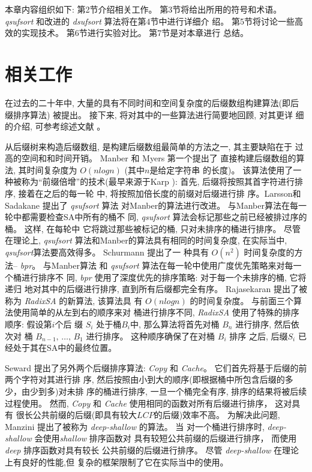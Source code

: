 本章内容组织如下: 第2节介绍相关工作。 第3节将给出所用的符号和术语。
\emph{qsufsort} 和改进的 \emph{dsufsort} 算法将在第4节中进行详细介
绍。 第5节将讨论一些高效的实现技术。 第6节进行实验对比。 第7节是对本章进行
总结。

\section{相关工作}

在过去的二十年中, 大量的具有不同时间和空间复杂度的后缀数组构建算法(即后
缀排序算法) 被提出。 接下来, 将对其中的一些算法进行简要地回顾, 对其更详
细的介绍, 可参考综述文献 \cite{Puglisi2007} \cite{Dhaliwal2012}。

从后缀树来构造后缀数组, 是构建后缀数组最简单的方法之一, 其主要缺陷在于
过高的空间和和时间开销。 Manber 和 Myers \cite{Manber1993} 第一个提出了
直接构建后缀数组的算法, 其时间复杂度为 $O(nlogn)$ (其中$n$是给定字符串
的长度)。 该算法使用了一种被称为“前缀倍增”的技术(最早来源于Karp
\cite{Karp1972}): 首先, 后缀将按照其首字符进行排序, 接着在之后的每一轮
中, 将按照加倍长度的前缀对后缀进行排
序。Larsson和Sadakane\cite{Larsson2007} 提出了 \emph{qsufsort} 算法
对Manber的算法进行改进。 与Manber算法在每一轮中都需要检查SA中所有的桶不
同, \emph{qsufsort} 算法会标记那些之前已经被排过序的桶。 这样, 在每轮中
它将跳过那些被标记的桶, 只对未排序的桶进行排序。 尽管在理论上,
\emph{qsufsort} 算法和Manber的算法具有相同的时间复杂度, 在实际当中,
\emph{qsufsort}算法要高效得多。 Schurmann\cite{Schurmann2007} 提出了一
种具有 $O(n^2)$ 时间复杂度的方法-- \emph{bpr}。 与Manber算法
和 \emph{qsufsort} 算法在每一轮中使用广度优先策略来对每一个桶进行排序不
同, \emph{bpr} 使用了深度优先的排序策略: 对于每一个未排序的桶, 它将递归
地对其中的后缀进行排序, 直到所有后缀都完全有序。  Rajasekaran
\cite{Rajasekaran2014} 提出了被称为 \emph{RadixSA} 的新算法, 该算法具
有 $O(nlogn)$ 的时间复杂度。 与前面三个算法使用简单的从左到右的顺序来对
桶进行排序不同, \emph{RadixSA} 使用了特殊的排序顺序: 假设第$i$个后
缀 $S_i$ 处于桶$B_i$中, 那么算法将首先对桶 $B_n$ 进行排序, 然后依次对
桶 $B_{n-1},\,\dots,\, B_1$ 进行排序。 这种顺序确保了在对桶 $B_i$ 排序
之后, 后缀$S_i$ 已经处于其在SA中的最终位置。

Seward \cite{Seward2000} 提出了另外两个后缀排序算法:
\emph{Copy} 和 \emph{Cache}。 它们首先将基于后缀的前两个字符对其进行排
序, 然后按照由小到大的顺序(即根据桶中所包含后缀的多少，由少到多)对未排
序的桶进行排序, 一旦一个桶完全有序, 排序的结果将被后续过程使用。 然而,
\emph{Copy} 和 \emph{Cache} 使用相同的函数对所有后缀进行排序， 这对具有
很长公共前缀的后缀(即具有较大$LCP$的后缀)效率不高。 为解决此问题,
Manzini \cite{Manzini2004} 提出了被称为 \emph{deep-shallow} 的算法。 当
对一个桶进行排序时, \emph{deep-shallow} 会使用\emph{shallow} 排序函数对
具有较短公共前缀的后缀进行排序， 而使用 \emph{deep} 排序函数对具有较长
公共前缀的后缀进行排序。 尽管 \emph{deep-shallow} 在理论上有良好的性能,但
复杂的框架限制了它在实际当中的使用。

